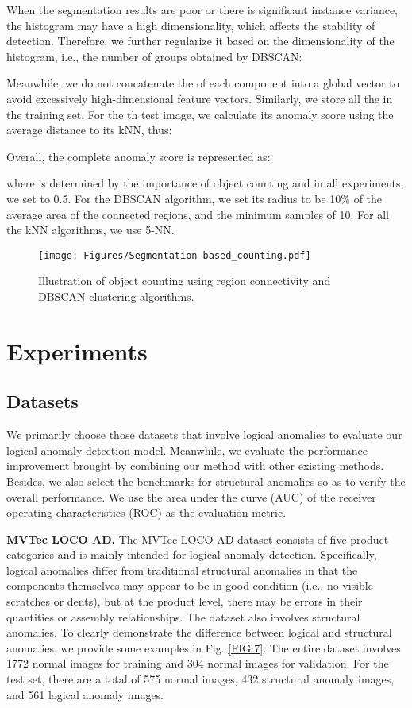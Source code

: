 \documentclass[final,5p,times,twocolumn]{elsarticle}
\begin{document}
When the segmentation results are poor or there is significant instance variance, the histogram may have a high dimensionality, which affects the stability of detection. Therefore, we further regularize it based on the dimensionality  of the histogram, i.e., the number of groups obtained by DBSCAN:

Meanwhile, we do not concatenate the  of each component into a global vector to avoid excessively high-dimensional feature vectors. Similarly, we store all the  in the training set. For the th test image, we calculate its anomaly score  using the average  distance to its kNN, thus:



Overall, the complete anomaly score  is represented as:

where  is determined by the importance of object counting and in all experiments, we set  to 0.5. For the DBSCAN algorithm, we set its radius to be 10\% of the average area of the connected regions, and the minimum samples of 10. For all the kNN algorithms, we use 5-NN.

\begin{figure}
\centering
		\texttt{[image: Figures/Segmentation-based\_counting.pdf]}\caption{Illustration of object counting using region connectivity and DBSCAN clustering algorithms.}
	\label{FIG:6}
\end{figure}

\section{Experiments}
\subsection{Datasets}
\label{4.1}
We primarily choose those datasets that involve logical anomalies to evaluate our logical anomaly detection model. Meanwhile, we evaluate the performance improvement brought by combining our method with other existing methods. Besides, we also select the benchmarks for structural anomalies so as to verify the overall performance. We use the area under the curve (AUC) of the receiver operating characteristics (ROC) as the evaluation metric.

\textbf{MVTec LOCO AD.} The MVTec LOCO AD dataset \cite{bergmann2022beyond} consists of five product categories and is mainly intended for logical anomaly detection. Specifically, logical anomalies differ from traditional structural anomalies in that the components themselves may appear to be in good condition (i.e., no visible scratches or dents), but at the product level, there may be errors in their quantities or assembly relationships. The dataset also involves structural anomalies. To clearly demonstrate the difference between logical and structural anomalies, we provide some examples in Fig. \ref{FIG:7}. The entire dataset involves 1772 normal images for training and 304 normal images for validation. For the test set, there are a total of 575 normal images, 432 structural anomaly images, and 561 logical anomaly images.
\end{document}
